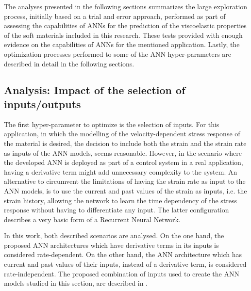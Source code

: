 The analyses presented in the following sections summarizes the large exploration process, initially based on a trial and error approach, performed as part of assessing the capabilities of ANNs for the prediction of the viscoelastic properties of the soft materials included in this research. These tests provided with enough evidence on the capabilities of ANNs for the mentioned application. Lastly, the optimization processes performed to some of the ANN hyper-parameters are described in detail in the following sections.

\subsection{Analysis: Impact of the selection of inputs/outputs}

The first hyper-parameter to optimize is the selection of inputs. For this application, in which the modelling of the velocity-dependent stress response of the material is desired, the decision to include both the strain and the strain rate as inputs of the ANN models, seems reasonable. However, in the scenario where the developed ANN is deployed as part of a control system in a real application, having a derivative term might add unnecessary complexity to the system. An alternative to circumvent the limitations of having the strain rate as input to the ANN models, is to use the current and past values of the strain as inputs, i.e. the strain history, allowing the network to learn the time dependency of the stress response without having to differentiate any input. The latter configuration describes a very basic form of a Recurrent Neural Network. 

In this work, both described scenarios are analysed. On the one hand, the proposed ANN architectures which have derivative terms in its inputs is considered rate-dependent. On the other hand, the ANN architecture which has current and past values of their inputs, instead of a derivative term, is considered rate-independent. The proposed combination of inputs used to create the ANN models studied in this section, are described in .

